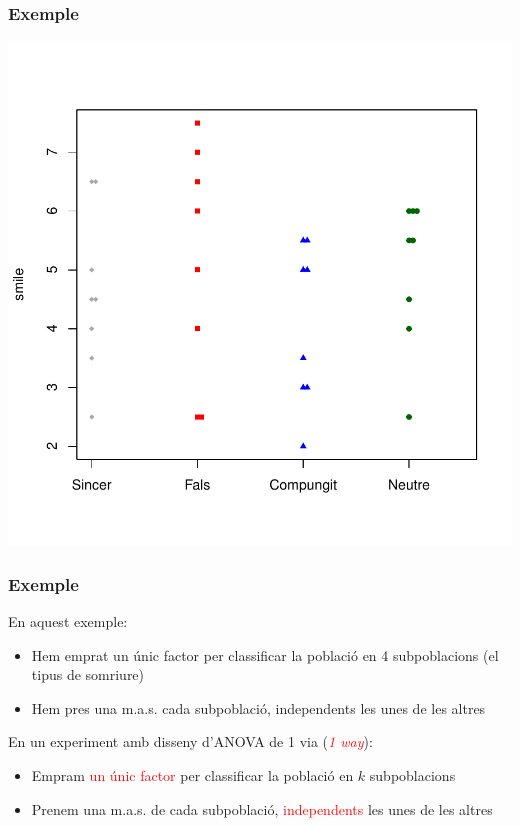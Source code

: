 \documentclass[12pt,t]{beamer}
\newcommand{\red}[1]{\textcolor{red}{#1}}
\renewcommand{\emph}[1]{{\color{red}#1}}
\theoremstyle{plain}
\theoremstyle{definition}
\begin{document}
\begin{frame}
\frametitle{Exemple}\vspace*{-2ex}

\begin{center}
\includegraphics[width=0.8\linewidth]{plotsmile1}
\end{center}

\end{frame}

\begin{frame}
\frametitle{Exemple}

En aquest exemple:

\begin{itemize}
\item Hem emprat un únic factor per classificar la població en 4 subpoblacions (el tipus de somriure)\medskip

\item Hem pres una m.a.s.  cada subpoblació,  independents les unes de les altres
\end{itemize}\pause\medskip

En un experiment amb \emph{disseny d'ANOVA de 1 via} (\textsl{\red{1 way}}):
\begin{itemize}
\item Empram \red{un únic factor} per classificar la població en $k$ subpoblacions
\smallskip



\item Prenem una m.a.s. de cada subpoblació,  \red{ independents} les unes de les altres
\end{itemize}
\end{frame}
\end{document}

